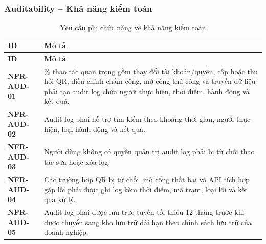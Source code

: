 \subsubsection{Auditability -- Khả năng kiểm toán}
\begingroup
\small
\renewcommand{\arraystretch}{1.2}
\begin{longtable}{|>{\centering\arraybackslash}m{3cm}|>{\raggedright\arraybackslash}m{12.9cm}|}
    \caption{Yêu cầu phi chức năng về khả năng kiểm toán}\label{tab:nfr-auditability}\\
    \hline
    \textbf{ID} & \textbf{Mô tả}\\
    \hline
    \endfirsthead
    \hline
    \textbf{ID} & \textbf{Mô tả}\\
    \hline
    \endhead
    \hline
    \endfoot
    \hline
    \endlastfoot
    \textbf{NFR-AUD-01} & 100\% thao tác quan trọng gồm thay đổi tài khoản/quyền, cấp hoặc thu hồi QR, điều chỉnh chấm công, mở cổng thủ công và truyền dữ liệu phải tạo audit log chứa người thực hiện, thời điểm, hành động và kết quả.\\
    \hline
    \textbf{NFR-AUD-02} & Audit log phải hỗ trợ tìm kiếm theo khoảng thời gian, người thực hiện, loại hành động và kết quả.\\
    \hline
    \textbf{NFR-AUD-03} & Người dùng không có quyền quản trị audit log phải bị từ chối thao tác sửa hoặc xóa log.\\
    \hline
    \textbf{NFR-AUD-04} & Các trường hợp QR bị từ chối, mở cổng thất bại và API tích hợp gặp lỗi phải được ghi log kèm thời điểm, mã trạm, loại lỗi và kết quả xử lý.\\
    \hline
    \textbf{NFR-AUD-05} & Audit log phải được lưu trực tuyến tối thiểu 12 tháng trước khi được chuyển sang kho lưu trữ dài hạn theo chính sách lưu trữ của doanh nghiệp.\\
    \hline
\end{longtable}
\endgroup

